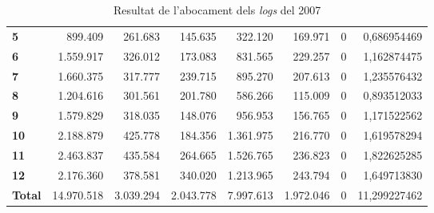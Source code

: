 \begin{table}[h!]
\begin{adjustbox}{width=1.5\textwidth, center}
\begin{tabular}{|l|r|r|r|r|r|r|r|}
            \midrule
            \textbf{5}     & 899.409    & 261.683   & 145.635   & 322.120   & 169.971   & 0 & 0,686954469  \\
            \textbf{6}     & 1.559.917  & 326.012   & 173.083   & 831.565   & 229.257   & 0 & 1,162874475  \\
            \textbf{7}     & 1.660.375  & 317.777   & 239.715   & 895.270   & 207.613   & 0 & 1,235576432  \\
            \textbf{8}     & 1.204.616  & 301.561   & 201.780   & 586.266   & 115.009   & 0 & 0,893512033  \\
            \midrule
            \textbf{9}     & 1.579.829  & 318.035   & 148.076   & 956.953   & 156.765   & 0 & 1,171522562  \\
            \textbf{10}    & 2.188.879  & 425.778   & 184.356   & 1.361.975 & 216.770   & 0 & 1,619578294  \\
            \textbf{11}    & 2.463.837  & 435.584   & 264.665   & 1.526.765 & 236.823   & 0 & 1,822625285  \\
            \textbf{12}    & 2.176.360  & 378.581   & 340.020   & 1.213.965 & 243.794   & 0 & 1,649713830  \\
            \midrule
            \textbf{Total} & 14.970.518 & 3.039.294 & 2.043.778 & 7.997.613 & 1.972.046 & 0 & 11,299227462 \\
            \bottomrule
        \end{tabular}
    \end{adjustbox}
    \caption{Resultat de l'abocament dels \textit{logs} del 2007}
    \label{tab:logs-table-2007}
\end{table}
